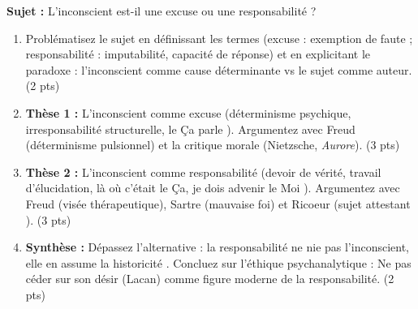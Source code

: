 \documentclass[11pt]{article}
\begin{document}
\begin{exercice}
\textbf{Sujet :} \og L'inconscient est-il une excuse ou une responsabilité ? \fg{}
\begin{enumerate}
    \item Problématisez le sujet en définissant les termes (excuse : exemption de faute ; responsabilité : imputabilité, capacité de réponse) et en explicitant le paradoxe : l'inconscient comme cause déterminante vs le sujet comme auteur. (2 pts)
    \item \textbf{Thèse 1 :} L'inconscient comme \og excuse \fg{} (déterminisme psychique, irresponsabilité structurelle, \og le Ça parle \fg{}). Argumentez avec Freud (déterminisme pulsionnel) et la critique morale (Nietzsche, \textit{Aurore}). (3 pts)
    \item \textbf{Thèse 2 :} L'inconscient comme \og responsabilité \fg{} (devoir de vérité, travail d'élucidation, \og là où c'était le Ça, je dois advenir le Moi \fg{}). Argumentez avec Freud (visée thérapeutique), Sartre (mauvaise foi) et Ricoeur (\og sujet attestant \fg{}). (3 pts)
    \item \textbf{Synthèse :} Dépassez l'alternative : la responsabilité ne nie pas l'inconscient, elle en assume la \og historicité \fg{}. Concluez sur l'éthique psychanalytique : \og Ne pas céder sur son désir \fg{} (Lacan) comme figure moderne de la responsabilité. (2 pts)
\end{enumerate}
\end{exercice}
\end{document}

